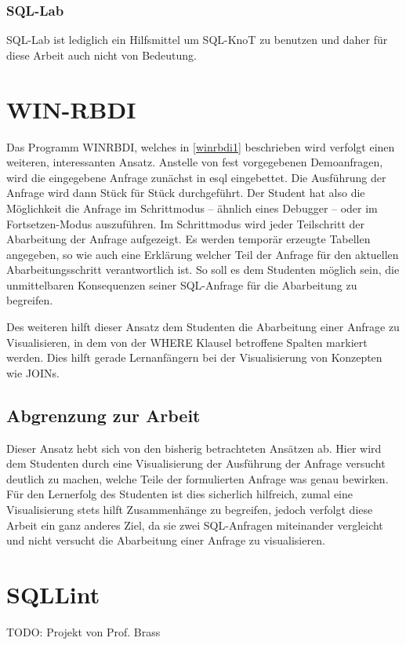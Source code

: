 \subsubsection{SQL-Lab}

SQL-Lab ist lediglich ein Hilfsmittel um SQL-KnoT zu benutzen und daher für diese Arbeit auch nicht von Bedeutung. 

\section{WIN-RBDI}

Das Programm WINRBDI, welches in \ref{winrbdi1} beschrieben wird verfolgt einen weiteren, interessanten Ansatz. Anstelle von fest vorgegebenen Demoanfragen, wird die eingegebene Anfrage zunächst in esql eingebettet. Die Ausführung der Anfrage wird dann Stück für Stück durchgeführt. Der Student hat also die Möglichkeit die Anfrage im Schrittmodus -- ähnlich eines Debugger -- oder im Fortsetzen-Modus auszuführen. Im Schrittmodus wird jeder Teilschritt der Abarbeitung der Anfrage aufgezeigt. Es werden temporär erzeugte Tabellen angegeben, so wie auch eine Erklärung welcher Teil der Anfrage für den aktuellen Abarbeitungsschritt verantwortlich ist. So soll es dem Studenten möglich sein, die unmittelbaren Konsequenzen seiner SQL-Anfrage für die Abarbeitung zu begreifen. 

Des weiteren hilft dieser Ansatz dem Studenten die Abarbeitung einer Anfrage zu Visualisieren, in dem von der WHERE Klausel betroffene Spalten markiert werden. Dies hilft gerade Lernanfängern bei der Visualisierung von Konzepten wie JOINs.

\subsection*{Abgrenzung zur Arbeit}

Dieser Ansatz hebt sich von den bisherig betrachteten Ansätzen ab. Hier wird dem Studenten durch eine Visualisierung der Ausführung der Anfrage versucht deutlich zu machen, welche Teile der formulierten Anfrage was genau bewirken. Für den Lernerfolg des Studenten ist dies sicherlich hilfreich, zumal eine Visualisierung stets hilft Zusammenhänge zu begreifen, jedoch verfolgt diese Arbeit ein ganz anderes Ziel, da sie zwei SQL-Anfragen miteinander vergleicht und nicht versucht die Abarbeitung einer Anfrage zu visualisieren.

\section{SQLLint}

TODO: Projekt von Prof. Brass